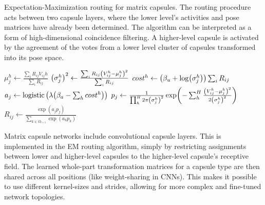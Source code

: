 \begin{algorithm}
\caption[Expectation-Maximization routing for matrix capsules]{Expectation-Maximization routing for matrix capsules. The routing procedure acts between two capsule layers, where the lower level's activities and pose matrices have already been determined. The algorithm can be interpreted as a form of high-dimensional coincidence filtering. A higher-level capsule is activated by the agreement of the votes from a lower level cluster of capsules transformed into its pose space.}\label{alg:em-routing}
\begin{algorithmic}[1]
        \EndFor
    \EndFor
            \State{}
        \EndFor
            \State{}
        \EndFor
    \EndFor
    \State{}
\EndProcedure
{}
    \EndFor
        \State $\mu_{j}^h \gets \frac{\sum_i R_{ij} V_{ij}h}{\sum_i R_{ij}}$
        \State $\qty(\sigma_j^h)^2 \gets \frac{\sum_i R_{ij} \qty(V_{ij}^h-\mu_j^h)^2}{\sum_i R_{ij}}$
        \State $cost^h \gets \qty(\beta_u + \log(\sigma_j^h))\sum_i R_{ij}$
    \EndFor
    \State $a_j \gets \operatorname{logistic}\qty(\lambda\qty(\beta_a - \sum_h cost^h))$
    \State{}
\EndProcedure
{}
        \State $p_j \gets \frac{1}{\prod_h^H 2\pi \qty(\sigma_j^h)^2}\exp(-\sum_h^H\frac{\qty(V_{ij}^h-\mu_j^h)^2}{2\qty(\sigma_j^h)^2})$
        \State $R_{ij} \gets \frac{\exp(a_j p_j)}{\sum_{k\in\Omega_{l+1}} \exp(a_k p_k)}$
        \State{}
    \EndFor
\EndProcedure
\end{algorithmic}
\end{algorithm}
\noindent
Matrix capsule networks include convolutional capsule layers. This is implemented in the EM routing algorithm, simply by restricting assignments between lower and higher-level capsules to the higher-level capsule's receptive field. The learned whole-part transformation matrices for a capsule type are then shared across all positions (like weight-sharing in CNNs). This makes it possible to use different kernel-sizes and strides, allowing for more complex and fine-tuned network topologies. 
